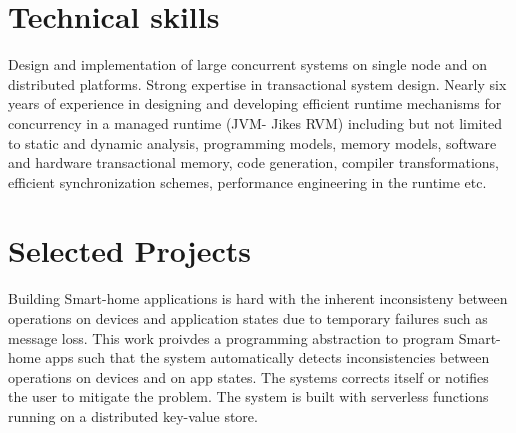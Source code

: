\documentclass[10pt,a4paper,roman]{moderncv}
\begin{document}
\section{Technical skills}
{Design and implementation of large concurrent systems on single node and on distributed platforms. Strong expertise in transactional system design.}
{Nearly six years of experience in designing and developing efficient runtime mechanisms for concurrency in a managed runtime (JVM- Jikes RVM) including but not limited to static and dynamic analysis, programming models, memory models, software and hardware transactional memory, code generation, compiler transformations, efficient synchronization schemes, performance engineering in the runtime etc.}

\section{Selected Projects}
Building Smart-home applications is hard with the inherent inconsisteny between operations on devices and application states due to temporary failures such as message loss. This work
proivdes a programming abstraction to program Smart-home apps such that the system automatically detects inconsistencies between operations on devices and on app states. The systems
corrects itself or notifies the user to mitigate the problem. The system is built with serverless functions running on a distributed key-value store.
\end{document}
